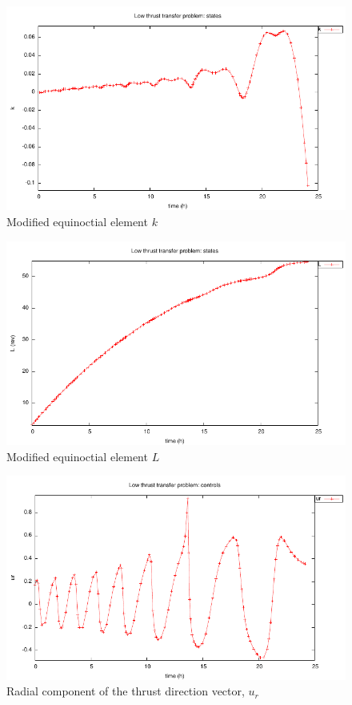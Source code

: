 \documentclass[a4paper,11pt]{report}    %
\begin{document}
\begin{figure}
  \centering 
  \includegraphics{../examples/lowthr/lowthr_x5}
  \caption{Modified equinoctial element $k$}
 \label{fig:lowthr_x5}
\end{figure}

\begin{figure}
  \centering 
  \includegraphics{../examples/lowthr/lowthr_x6}
  \caption{Modified equinoctial element $L$}
 \label{fig:lowthr_x6}
\end{figure}


\begin{figure}
  \centering 
  \includegraphics{../examples/lowthr/lowthr_u1}
  \caption{Radial component of the thrust direction vector, $u_r$}
 \label{fig:lowthr_u1}
\end{figure}
\end{document}
